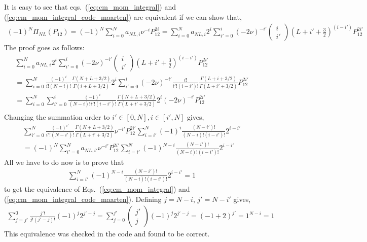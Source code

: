 \documentclass[10pt]{article}
\begin{document}
It is easy to see that eqs.~(\ref{eq:cm_mom_integral}) and (\ref{eq:cm_mom_integral_code_maarten}) are equivalent if we can show that,
\begin{align*}
(-1)^{N} \Pi_{NL}(P_{12}) = 
(-1)^{N} \sum_{i=0}^{N}  a_{NL,i}  \nu^{-i} P_{12}^{2i} = \sum_{i=0}^{N} a_{NL,i}  2^{i} 
	\sum_{i'=0}^{i}  (-2 \nu)^{-i'}	
	\left( \begin{array}{c} i \\ i' \end{array} \right)
	(L+i'+\frac{3}{2})^{(i-i')}
	 P_{12}^{2i'} 
\end{align*}
The proof goes as follows:
\begin{multline*}
\sum_{i=0}^{N} a_{NL,i}  2^{i} \sum_{i'=0}^{i}  (-2 \nu)^{-i'}\left( \begin{array}{c} i \\ i' \end{array} \right) (L+i'+\frac{3}{2})^{(i-i')} P_{12}^{2i'} \\
=  \sum_{i=0}^{N} \frac{(-1)^{i}}{i! (N-i)!} \frac{ \Gamma(N+L+3/2) }{ \Gamma(i + L + 3/2)} 2^{i} \sum_{i'=0}^{i}  (-2 \nu)^{-i'} \frac{ i!}{ i'! (i-i')!} \frac{\Gamma(L+i+3/2)}{ \Gamma( L + i' + 3/2)} P_{12}^{2i'} \\
= \sum_{i=0}^{N} \sum_{i'=0}^{i} \frac{(-1)^{i}}{ (N-i)! i'! (i-i')!} \frac{ \Gamma(N+L+3/2) }{ \Gamma( L + i' + 3/2) } 2^{i}   (-2 \nu)^{-i'} P_{12}^{2i'} \\
\end{multline*}
Changing the summation order to $ i' \in [0,N], i \in [i',N]$ gives,
\begin{multline*}
\sum_{i'=0}^{N} \frac{(-1)^{i'}}{ i'! (N-i')!} \frac{ \Gamma(N+L+3/2) }{ \Gamma( L + i' + 3/2) } \nu^{-i'} P_{12}^{2i'} \sum_{i=i'}^{N} (-1)^{i} \frac{(N-i')!}{(N-i)! (i-i')!} 2^{i-i'}\\
= (-1)^{N} \sum_{i'=0}^{N} a_{NL,i'} \nu^{-i'} P_{12}^{2i'} \sum_{i=i'}^{N} (-1)^{N-i} \frac{(N-i')!}{(N-i)! (i-i')!} 2^{i-i'}
\end{multline*}
All we have to do now is to prove that 
\begin{align*}
	\sum_{i=i'}^{N} (-1)^{N-i} \frac{(N-i')!}{(N-i)! (i-i')!} 2^{i-i'} = 1
\end{align*}
to get the equivalence of Eqs.~(\ref{eq:cm_mom_integral}) and (\ref{eq:cm_mom_integral_code_maarten}). Defining $j=N-i$, $j'=N-i'$ gives,
\begin{align*}
	\sum_{j=j'}^{0}  \frac{j'!}{j! (j'-j)!} (-1)^{j} 2^{j'-j} = \sum_{j=0}^{j'} \left( \begin{array}{c} j' \\ j \end{array} \right) (-1)^{j} 2^{j'-j} = ( -1 + 2 )^{j'} = 1^{N-i} = 1
\end{align*}
This equivalence was checked in the code and found to be correct.
\end{document}
